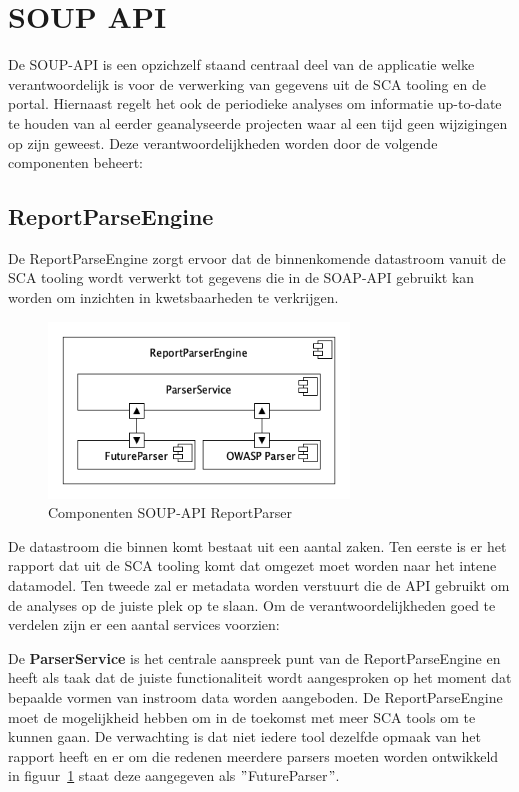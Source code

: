 \section{SOUP API}\label{sec:soup-api}
De SOUP-API is een opzichzelf staand centraal deel van de applicatie welke verantwoordelijk is voor de verwerking van gegevens uit de SCA tooling en de portal. Hiernaast regelt het ook de periodieke analyses om informatie up-to-date te houden van al eerder geanalyseerde projecten waar al een tijd geen wijzigingen op zijn geweest. Deze verantwoordelijkheden worden door de volgende componenten beheert:

\subsection{ReportParseEngine}\label{subsec:reportparseengine}
De ReportParseEngine zorgt ervoor dat de binnenkomende datastroom vanuit de SCA tooling wordt verwerkt tot gegevens die in de SOAP-API gebruikt kan worden om inzichten in kwetsbaarheden te verkrijgen.

\begin{figure}[bth]
    \myfloatalign
    \includegraphics[width=8cm]{gfx/umlet/exports/ReportParserComponents}
    \caption{Componenten SOUP-API ReportParser}
    \label{fig:SOUPAPIReportParserComps}
\end{figure}

De datastroom die binnen komt bestaat uit een aantal zaken. Ten eerste is er het rapport dat uit de SCA tooling komt dat omgezet moet worden naar het intene datamodel. Ten tweede zal er metadata worden verstuurt die de API gebruikt om de analyses op de juiste plek op te slaan. Om de verantwoordelijkheden goed te verdelen zijn er een aantal services voorzien:

De \textbf{ParserService} is het centrale aanspreek punt van de ReportParseEngine en heeft als taak dat de juiste functionaliteit wordt aangesproken op het moment dat bepaalde vormen van instroom data worden aangeboden. De ReportParseEngine moet de mogelijkheid hebben om in de toekomst met meer SCA tools om te kunnen gaan. De verwachting is dat niet iedere tool dezelfde opmaak van het rapport heeft en er om die redenen meerdere parsers moeten worden ontwikkeld in figuur~\ref{fig:SOUPAPIReportParserComps} staat deze aangegeven als $"$FutureParser$"$.

